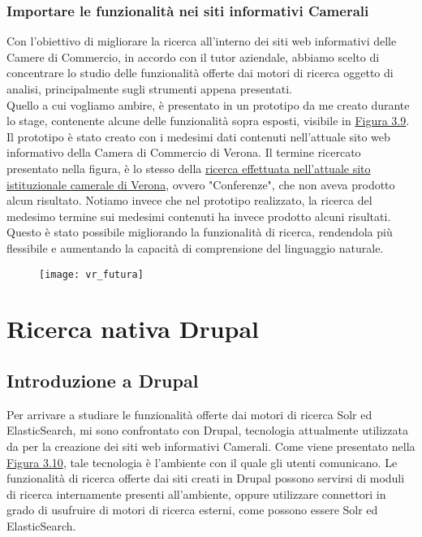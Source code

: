 			\subsubsection{Importare le funzionalità nei siti informativi Camerali}
			Con l'obiettivo di migliorare la ricerca all'interno dei siti web informativi delle Camere di Commercio, in accordo con il tutor aziendale, abbiamo scelto di concentrare lo studio delle funzionalità offerte dai motori di ricerca oggetto di analisi, principalmente sugli strumenti appena presentati. \\
			Quello a cui vogliamo ambire, è presentato in un prototipo da me creato durante lo stage, contenente alcune delle funzionalità sopra esposti, visibile in \hyperref[img:evoluzioneVR]{Figura 3.9}. \\
			Il prototipo è stato creato con i medesimi dati contenuti nell'attuale sito web informativo della Camera di Commercio di Verona. Il termine ricercato presentato nella figura, è lo stesso della \hyperref[img:conferenze]{ricerca effettuata nell'attuale sito istituzionale camerale di Verona}, ovvero "Conferenze", che non aveva prodotto alcun risultato. Notiamo invece che nel prototipo realizzato, la ricerca del medesimo termine sui medesimi contenuti ha invece prodotto alcuni risultati. Questo è stato possibile migliorando la funzionalità di ricerca, rendendola più flessibile e aumentando la capacità di comprensione del linguaggio naturale.

			\label{img:evoluzioneVR}
			\begin{figure}[htbp]
				\begin{center}
					\texttt{[image: vr\_futura]}
				\end{center}
			\end{figure}

	\section{Ricerca nativa Drupal}

		\subsection{Introduzione a Drupal}
		Per arrivare a studiare le funzionalità offerte dai motori di ricerca \gls{Solr} ed \gls{ElasticSearch}, mi sono confrontato con \gls{Drupal}, tecnologia attualmente utilizzata da \nomeAzienda per la creazione dei siti web informativi Camerali. Come viene presentato nella \hyperref[img:cciaa_drupal]{Figura 3.10}, tale tecnologia è l'ambiente con il quale gli utenti comunicano. Le funzionalità di ricerca offerte dai siti creati in \gls{Drupal} possono servirsi di moduli di ricerca internamente presenti all'ambiente, oppure utilizzare connettori in grado di usufruire di motori di ricerca esterni, come possono essere \gls{Solr} ed \gls{ElasticSearch}.
		
